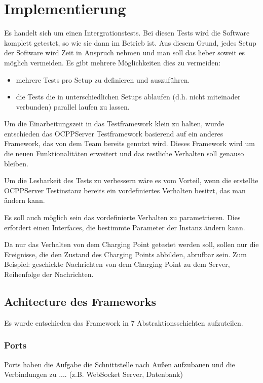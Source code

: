 \section{Implementierung}
    Es handelt sich um einen Intergrationstests. Bei diesen Tests wird die Software komplett getestet, so wie sie dann im Betrieb ist.
    Aus diesem Grund, jedes Setup der Software wird Zeit in Anspruch nehmen und man soll das lieber soweit es möglich vermeiden. 
    Es gibt mehrere Möglichkeiten dies zu vermeiden:
    \begin{itemize}
        \item mehrere Tests pro Setup zu definieren und auszuführen.
        \item  die Tests die in unterschiedlichen Setups ablaufen (d.h. nicht miteinader verbunden) parallel laufen zu lassen.
    \end{itemize}

    Um die Einarbeitungszeit in das Testframework klein zu halten, wurde entschieden das OCPPServer Testframework 
    basierend auf ein anderes Framework, das von dem Team bereits genutzt wird. Dieses Framework wird um die neuen Funktionalitäten erweitert
    und das restliche Verhalten soll genauso bleiben.

    Um die Lesbarkeit des Tests zu verbessern wäre es vom Vorteil, wenn die erstellte OCPPServer Testinstanz bereits ein vordefiniertes Verhalten besitzt, 
    das man ändern kann.

    Es soll auch möglich sein das vordefinierte Verhalten zu parametrieren. Dies erfordert einen Interfaces, die bestimmte Parameter der Instanz ändern kann.

    Da nur das Verhalten von dem Charging Point getestet werden soll, sollen nur die Ereignisse, die den Zustand des Charging Points abbilden, abrufbar sein.
    Zum Beispiel: geschickte Nachrichten von dem Charging Point zu dem Server, Reihenfolge der Nachrichten.

    \subsection{Achitecture des Frameworks}
    Es wurde entschieden das Framework in 7 Abstraktionsschichten aufzuteilen.
        \subsubsection{Ports}
        Ports haben die Aufgabe die Schnittstelle nach Außen aufzubauen und die Verbindungen zu .... (z.B. WebSocket Server, Datenbank)

